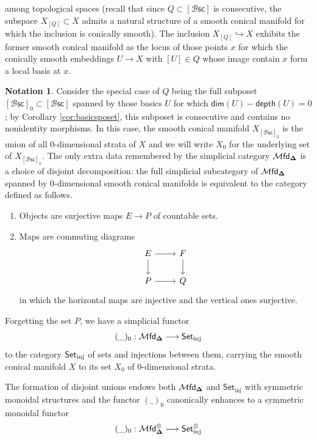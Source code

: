 \documentclass[10pt, reqno, twoside
, final
]{amsart}
\numberwithin{equation}{subsection}%
\theoremstyle{definition}
\theoremstyle{definition}
\theoremstyle{definition}
\newtheorem{nota}[defn]{Notation}
\theoremstyle{definition}
\theoremstyle{definition}
\theoremstyle{definition}
\theoremstyle{definition}
\theoremstyle{definition}
\theoremstyle{definition}
\theoremstyle{plain}
\theoremstyle{definition}
\theoremstyle{plain}
\theoremstyle{definition}
\theoremstyle{plain}
\theoremstyle{definition}
\theoremstyle{definition}
\theoremstyle{plain}
\theoremstyle{plain}
\theoremstyle{definition}
\theoremstyle{plain}
\theoremstyle{plain}
\theoremstyle{plain}
\begin{document}
among topological spaces (recall that since $Q\subset  [\mathcal{B}\mathsf{sc}]$ is consecutive, the subspace $X_{[Q]} \subset X$ admits a natural structure of a smooth conical manifold for which the inclusion is conically smooth). The inclusion $X_{[Q]}\hookrightarrow X$ exhibits the former smooth conical manifold as the locus of those points $x$ for which the conically smooth embeddings $U\rightarrow X$ with $[U]\in Q$ whose image contain $x$ form a local basis at $x$. 
\begin{nota}\label{nota:0dimstratafunctor}
Consider the special case of $Q$ being the full subposet $[\mathcal{B}\mathsf{sc}]_0\subset [\mathcal{B}\mathsf{sc}]$ spanned by those basics $U$ for which $\mathsf{dim}(U)-\mathsf{depth}(U) =0$; by Corollary \ref{cor:basicsposet}, this subposet is consecutive and contains no nonidentity morphisms. In this case, the smooth conical manifold $X_{[\mathcal{B}\mathsf{sc}]_0}$ is the union of all 0-dimensional strata of $X$ and we will write $X_0$ for the underlying set of $X_{[\mathcal{B}\mathsf{sc}]_0}$. The only extra data remembered by the simplicial category $\mathcal{M}\mathsf{fd}_{\boldsymbol{\Delta}}$ is a choice of disjoint decomposition: the full simplicial subcategory of $\mathcal{M}\mathsf{fd}_{\boldsymbol{\Delta}}$ spanned by 0-dimensional smooth conical manifolds is equivalent to the category defined as follows. 
\begin{enumerate}
    \item[$(O)$] Objects are surjective maps $E\rightarrow P$ of countable sets.
    \item[$(M)$] Maps are commuting diagrams
    \[
\begin{tikzcd}
E \ar[d] \ar[r] & F\ar[d] \\
P \ar[r] & Q
\end{tikzcd}
\]
in which the horizontal maps are injective and the vertical ones surjective.
\end{enumerate}
Forgetting the set $P$, we have a simplicial functor
\[ (\_)_0: \mathcal{M}\mathsf{fd}_{\boldsymbol{\Delta}} \longrightarrow \mathsf{Set}_{\mathrm{inj}} \]
to the category $\mathsf{Set}_{\mathrm{inj}}$ of sets and injections between them, carrying the smooth conical manifold $X$ to its set $X_0$ of 0-dimensional strata. 
\end{nota}
The formation of disjoint unions endows both $\mathcal{M}\mathsf{fd}_{\boldsymbol{\Delta}}$ and $\mathsf{Set}_{\mathrm{inj}}$ with symmetric monoidal structures and the functor $(\_)_0$ canonically enhances to a symmetric monoidal functor
\[ (\_)_0: \mathcal{M}\mathsf{fd}^{\otimes}_{\boldsymbol{\Delta}} \longrightarrow \mathsf{Set}_{\mathrm{inj}}^{\otimes} \]
\end{document}
